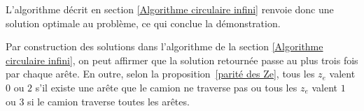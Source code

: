L'algorithme décrit en section \ref{Algorithme circulaire infini} renvoie donc une solution optimale au problème, ce qui conclue la démonstration.

\begin{rmq}
Par construction des solutions dans l'algorithme de la section \ref{Algorithme circulaire infini}, on peut affirmer que la solution retournée passe au plus trois fois par chaque arête. En outre, selon la proposition~\ref{parité des Ze}, tous les $z_e$ valent $0$ ou $2$ s'il existe une arête que le camion ne traverse pas ou tous les $z_e$ valent $1$ ou $3$ si le camion traverse toutes les arêtes.
\end{rmq}